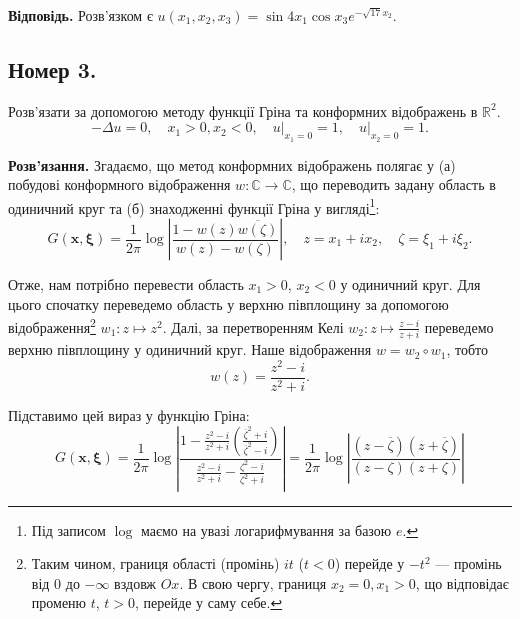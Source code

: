 \documentclass{hw_template}
\begin{document}
\textbf{Відповідь.} Розв'язком є $u(x_1,x_2,x_3) = \sin 4x_1 \cos x_3 e^{-\sqrt{17}x_2}$.

\newpage

\subsection{Номер 3.}

\begin{problem}
    Розв'язати за допомогою методу функції Гріна та конформних відображень в $\mathbb{R}^2$.
    \begin{equation*}
        -\Delta u = 0, \quad x_1 > 0, x_2 < 0, \quad u\Big|_{x_1=0} = 1, \quad u\Big|_{x_2=0} = 1.
    \end{equation*}
\end{problem}

\textbf{Розв'язання.} Згадаємо, що метод конформних відображень полягає у (а) побудові
конформного відображення $w: \mathbb{C} \to \mathbb{C}$, що переводить задану 
область в одиничний круг та (б) знаходженні функції Гріна у вигляді\footnote{Під записом $\log$ маємо на увазі логарифмування за базою $e$.}:
\begin{equation*}
    G(\mathbf{x}, \boldsymbol{\xi}) = \frac{1}{2\pi}\log \left|\frac{1-w(z)\overline{w(\zeta)}}{w(z)-w(\zeta)}\right|, \quad z=x_1+ix_2, \quad \zeta=\xi_1+i\xi_2.
\end{equation*}

Отже, нам потрібно перевести область $x_1>0$, $x_2<0$ у одиничний круг. Для
цього спочатку переведемо область у верхню півплощину за допомогою
відображення\footnote{Таким чином, границя області (промінь) $it$ ($t<0$)
перейде у $-t^2$ --- промінь від $0$ до $-\infty$ вздовж $Ox$. В свою чергу,
границя $x_2=0,x_1>0$, що відповідає променю $t$, $t>0$, перейде у саму себе.}
$w_1: z \mapsto z^2$. Далі, за перетворенням Келі $w_2: z \mapsto
\frac{z-i}{z+i}$ переведемо верхню півплощину у одиничний круг. Наше
відображення $w = w_2 \circ w_1$, тобто
\begin{equation*}
    w(z) = \frac{z^2-i}{z^2+i}.
\end{equation*}

Підставимо цей вираз у функцію Гріна:
\begin{equation*}
    G(\mathbf{x}, \boldsymbol{\xi}) = \frac{1}{2\pi}\log \left|\frac{1-\frac{z^2-i}{z^2+i}\left(\frac{\overline{\zeta}^2+i}{\overline{\zeta}^2-i}\right)}{\frac{z^2-i}{z^2+i}-\frac{\zeta^2-i}{\zeta^2+i}}\right| = 
    \frac{1}{2\pi}\log\left|\frac{(z-\overline{\zeta})(z+\overline{\zeta})}{(z-\zeta)(z+\zeta)}\right|
\end{equation*}
\end{document}
